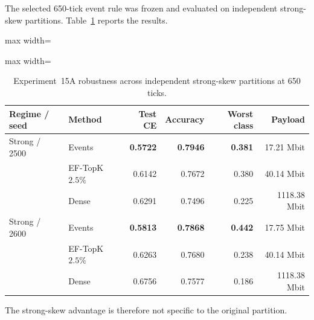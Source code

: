 The selected 650-tick event rule was frozen and evaluated on independent strong-skew partitions. Table~\ref{tab:exp15a-strong-robustness} reports the results.
\begin{table}[ht]
\centering
\small
\caption{Experiment~15A robustness across independent strong-skew partitions at 650 ticks.}
\label{tab:exp15a-strong-robustness}
\begin{adjustbox}{max width=\textwidth}
\begin{adjustbox}{max width=\textwidth}
\begin{tabular}{llrrrr}
\toprule
Regime / seed & Method & Test CE & Accuracy & Worst class & Payload\\
\midrule
Strong / 2500 & Events & \textbf{0.5722} & \textbf{0.7946} & \textbf{0.381} & 17.21 Mbit\\
 & EF-TopK $2.5\%$ & 0.6142 & 0.7672 & 0.380 & 40.14 Mbit\\
 & Dense & 0.6291 & 0.7496 & 0.225 & 1118.38 Mbit\\
\addlinespace
Strong / 2600 & Events & \textbf{0.5813} & \textbf{0.7868} & \textbf{0.442} & 17.75 Mbit\\
 & EF-TopK $2.5\%$ & 0.6263 & 0.7680 & 0.238 & 40.14 Mbit\\
 & Dense & 0.6756 & 0.7577 & 0.186 & 1118.38 Mbit\\
\bottomrule
\end{tabular}
\end{adjustbox}
\end{adjustbox}
\end{table}
The strong-skew advantage is therefore not specific to the original partition.

